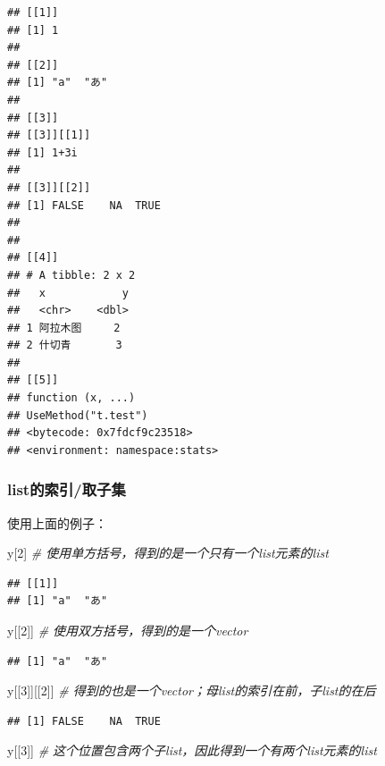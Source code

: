 \documentclass[]{book}
\newenvironment{Shaded}{\begin{snugshade}}{\end{snugshade}}
\newcommand{\CommentTok}[1]{\textcolor[rgb]{0.56,0.35,0.01}{\textit{#1}}}
\newcommand{\DecValTok}[1]{\textcolor[rgb]{0.00,0.00,0.81}{#1}}
\newcommand{\NormalTok}[1]{#1}
\begin{document}
\begin{verbatim}
## [[1]]
## [1] 1
## 
## [[2]]
## [1] "a"  "あ"
## 
## [[3]]
## [[3]][[1]]
## [1] 1+3i
## 
## [[3]][[2]]
## [1] FALSE    NA  TRUE
## 
## 
## [[4]]
## # A tibble: 2 x 2
##   x            y
##   <chr>    <dbl>
## 1 阿拉木图     2
## 2 什切青       3
## 
## [[5]]
## function (x, ...) 
## UseMethod("t.test")
## <bytecode: 0x7fdcf9c23518>
## <environment: namespace:stats>
\end{verbatim}

\hypertarget{list}{%
\subsubsection{list的索引/取子集}\label{list}}

使用上面的例子：

\begin{Shaded}
\begin{Highlighting}[]
\NormalTok{y[}\DecValTok{2}\NormalTok{] }\CommentTok{# 使用单方括号，得到的是一个只有一个list元素的list}
\end{Highlighting}
\end{Shaded}

\begin{verbatim}
## [[1]]
## [1] "a"  "あ"
\end{verbatim}

\begin{Shaded}
\begin{Highlighting}[]
\NormalTok{y[[}\DecValTok{2}\NormalTok{]] }\CommentTok{# 使用双方括号，得到的是一个vector}
\end{Highlighting}
\end{Shaded}

\begin{verbatim}
## [1] "a"  "あ"
\end{verbatim}

\begin{Shaded}
\begin{Highlighting}[]
\NormalTok{y[[}\DecValTok{3}\NormalTok{]][[}\DecValTok{2}\NormalTok{]] }\CommentTok{# 得到的也是一个vector；母list的索引在前，子list的在后}
\end{Highlighting}
\end{Shaded}

\begin{verbatim}
## [1] FALSE    NA  TRUE
\end{verbatim}

\begin{Shaded}
\begin{Highlighting}[]
\NormalTok{y[[}\DecValTok{3}\NormalTok{]] }\CommentTok{# 这个位置包含两个子list，因此得到一个有两个list元素的list}
\end{Highlighting}
\end{Shaded}
\end{document}
